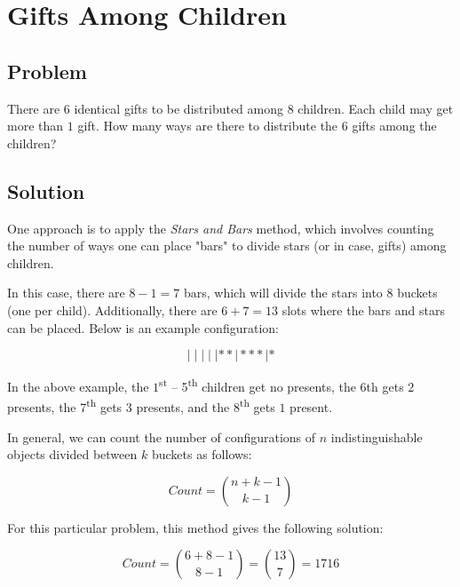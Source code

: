 \documentclass{article}
\date{}
\title{}
\author{Kaan Aksoy | Mar 28, 2020}
\begin{document}
\maketitle

\section{Gifts Among Children}

\subsection{Problem}

There are $6$ identical gifts to be distributed among $8$ 
children. Each child may get more than $1$ gift. How many 
ways are there to distribute the $6$ gifts among the children?

\subsection{Solution}

One approach is to apply the \textit{Stars and Bars} method, 
which involves counting the number of ways one can place "bars" 
to divide stars (or in case, gifts) among children.

In this case, there are $8-1=7$ bars, which will divide the stars 
into $8$ buckets (one per child). Additionally, there are 
$6+7=13$ slots where the bars and stars can be placed. Below is 
an example configuration:

$$|\;|\;|\;|\;|**|***|*$$

In the above example, the $1$\textsuperscript{st} -- 5\textsuperscript{th} 
children get no presents, the 6th gets $2$ presents, the 
7\textsuperscript{th} gets $3$ presents, and the 8\textsuperscript{th} 
gets $1$ present.

In general, we can count the number of configurations of $n$ 
indistinguishable objects divided between $k$ buckets as follows:

$$Count = \binom{n+k-1}{k-1}$$

For this particular problem, this method gives the following solution:

$$Count = \binom{6+8-1}{8-1} = \binom{13}{7} = 1716$$
\end{document}
